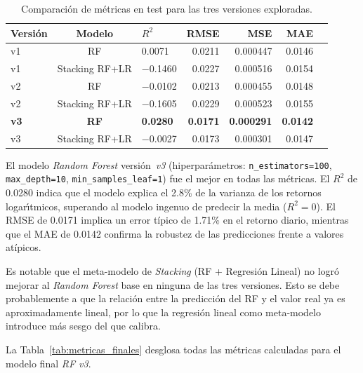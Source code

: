 \documentclass[12pt,a4paper]{article}
\begin{document}
\begin{table}[H]
\centering
\caption{Comparación de métricas en test para las tres versiones exploradas.}
\label{tab:comparativa}
\small
\begin{tabular}{lclrrrr}
\toprule
\textbf{Versión} & \textbf{Modelo} & \textbf{$R^{2}$} & \textbf{RMSE} & \textbf{MSE} & \textbf{MAE} \\
\midrule
v1    & RF                & 0.0071  & 0.0211  & 0.000447  & 0.0146 \\
v1    & Stacking RF+LR    & $-$0.1460 & 0.0227  & 0.000516  & 0.0154 \\
v2    & RF                & $-$0.0102 & 0.0213  & 0.000455  & 0.0148 \\
v2    & Stacking RF+LR    & $-$0.1605 & 0.0229  & 0.000523  & 0.0155 \\
\textbf{v3} & \textbf{RF}   & \textbf{0.0280} & \textbf{0.0171} & \textbf{0.000291} & \textbf{0.0142} \\
v3    & Stacking RF+LR    & $-$0.0027 & 0.0173  & 0.000301  & 0.0147 \\
\bottomrule
\end{tabular}
\end{table}

El modelo \textit{Random Forest} versi\'on~\textit{v3} (hiperpar\'ametros: \texttt{n\_estimators=100}, \texttt{max\_depth=10}, \texttt{min\_samples\_leaf=1}) fue el mejor en todas las m\'etricas. El $R^{2}$ de 0.0280 indica que el modelo explica el 2.8\% de la varianza de los retornos logar\'{\i}tmicos, superando al modelo ingenuo de predecir la media ($R^{2}=0$). El RMSE de 0.0171 implica un error t\'ipico de 1.71\% en el retorno diario, mientras que el MAE de 0.0142 confirma la robustez de las predicciones frente a valores at\'ipicos.

Es notable que el meta-modelo de \textit{Stacking} (RF + Regresión Lineal) no logró mejorar al \textit{Random Forest} base en ninguna de las tres versiones. Esto se debe probablemente a que la relación entre la predicción del RF y el valor real ya es aproximadamente lineal, por lo que la regresión lineal como meta-modelo introduce más sesgo del que calibra.

La Tabla~\ref{tab:metricas_finales} desglosa todas las métricas calculadas para el modelo final \textit{RF v3}.
\end{document}
